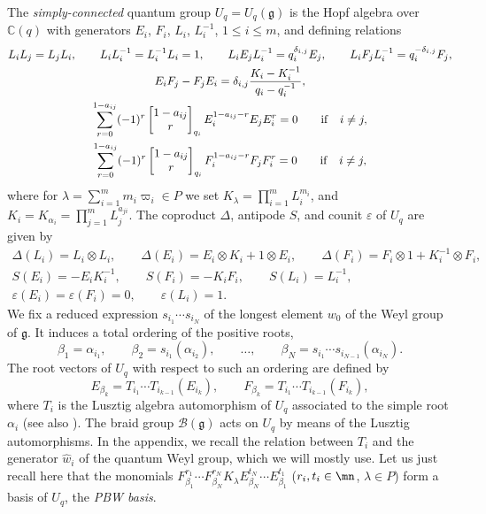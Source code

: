 The {\it simply-connected} quantum group $U_q = U_q(\mathfrak{g})$ is the Hopf algebra over $\mathbb {C}(q)$ with generators $E_i$, $F_i$, $L_i$, $L_i^{-1}$, $1\leq i \leq m$, and defining relations
\begin{gather*}%
L_iL_j=L_jL_i , \qquad L_iL_i^{-1}=L_i^{-1}L_i=1,\qquad L_iE_jL_i^{-1}=q_i^{\delta_{i,j}}E_j ,\qquad L_iF_jL_i^{-1}=q_i^{-\delta_{i,j}}F_j, \\
E_iF_j-F_jE_i=\delta_{i,j}\frac{K_i-K_i^{-1}}{q_i-q_i^{-1}},\\
\sum_{r=0}^{1-a_{ij}} (-1)^r \left[\begin{matrix} 1-a_{ij} \\ r \end{matrix}\right]_{q_i} E_i^{1-a_{ij}-r}E_jE_i^{r} = 0 \qquad {\rm if}\quad i\ne j,\\
\sum_{r=0}^{1-a_{ij}} (-1)^r \left[\begin{matrix} 1-a_{ij} \\ r \end{matrix}\right]_{q_i} F_i^{1-a_{ij}-r}F_jF_i^{r} = 0 \qquad {\rm if}\quad i\ne j,
\end{gather*}
where for $ \lambda=\sum_{i=1}^m m_i \varpi_i \in P$ we set $ K_\lambda=\prod_{i=1}^m L_i^{m_i}$, and $ K_i=K_{\alpha_i}=\prod_{j=1}^m L_j^{a_{ji}}$.
The coproduct $\Delta$, antipode $S$, and counit $\varepsilon$ of $U_q$ are given by
\begin{gather*}
\Delta(L_i)=L_i\otimes L_i ,\qquad \Delta(E_i)=E_i\otimes K_i+1\otimes E_i ,\qquad \Delta(F_i)=F_i\otimes 1 + K_i^{-1}\otimes F_i, \\ S(E_i) = -E_iK_i^{-1},\qquad S(F_i) = -K_iF_i ,\qquad S(L_i) = L_i^{- 1},\\ \varepsilon(E_i) = \varepsilon(F_i)=0,\qquad \varepsilon(L_i)=1.
\end{gather*}
We fix a reduced expression $s_{i_1}\cdots s_{i_N}$ of the longest element $w_0$ of the Weyl group of $\mathfrak{g}$. It induces a total ordering of the positive roots,
\[\beta_1 = \alpha_{i_1},\qquad \beta_2 = s_{i_1}(\alpha_{i_2}), \qquad \dots, \qquad\beta_N = s_{i_1}\cdots s_{i_{N-1}}(\alpha_{i_N}).\]
The root vectors of $U_q$ with respect to such an ordering are defined by
\begin{equation}\label{rootvectdef}
E_{\beta_k} = T_{i_1}\cdots T_{i_{k-1}}(E_{i_k}) ,\qquad F_{\beta_k} = T_{i_1}\cdots T_{i_{k-1}}(F_{i_k}),
\end{equation}
where $T_i$ is the Lusztig algebra automorphism of $U_q$ associated to the simple root $\alpha_i$ \mbox{\cite{Lusztig2,Lusztig}} (see also \cite[Chapter~8]{CP}). The braid group $\mathcal{B}(\mathfrak{g})$ acts on $U_q$ by means of the Lusztig automorphisms. In the appendix, we recall the relation between $T_i$ and the generator $\hat{w}_i$ of the quantum Weyl group, which we will mostly use. Let us just recall here that the monomials $F_{\beta_1}^{r_1}\cdots F_{\beta_N}^{r_N}K_\lambda E_{\beta_N}^{t_N}\cdots E_{\beta_1}^{t_1}$ ($r_i,t_i\in \mn$, $\lambda\in P$) form a basis of $U_q$, the {\it PBW basis}.

